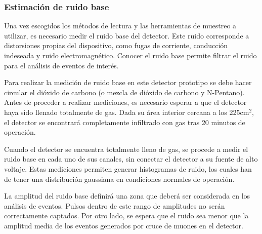		

	\subsubsection{Estimación de ruido base}
		Una vez escogidos los métodos de lectura y las herramientas de muestreo a utilizar, es necesario medir el ruido base del detector. Este ruido corresponde a distorsiones propias del dispositivo, como fugas de corriente, conducción indeseada y ruido electromagnético. Conocer el ruido base permite filtrar el ruido para el análisis de eventos de interés.
		
		Para realizar la medición de ruido base en este detector prototipo se debe hacer circular el dióxido de carbono (o mezcla de dióxido de carbono y N-Pentano). Antes de proceder a realizar mediciones, es necesario esperar a que el detector haya sido llenado totalmente de gas. Dada su área interior cercana a los 225cm$^2$, el detector se encontrará completamente infiltrado con gas tras 20 minutos de operación. %
		
		Cuando el detector se encuentra totalmente lleno de gas, se procede a medir el ruido base en cada uno de sus canales, sin conectar el detector a su fuente de alto voltaje. Estas mediciones permiten generar histogramas de ruido, los cuales han de tener una distribución gaussiana en condiciones normales de operación\cite{Naseri2021ATLASILC}. %
		
		La amplitud del ruido base definirá una zona que deberá ser considerada en los análisis de eventos. Pulsos dentro de este rango de amplitudes no serán correctamente captados. Por otro lado, se espera que el ruido sea menor que la amplitud media de los eventos generados por cruce de muones en el detector.
		
